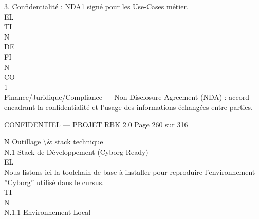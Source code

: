 \documentclass[12pt,landscape,a4paper]{article}
\newenvironment{confidential}
{\begin{tcolorbox}[
    colback=rbkred!5!white,
    colframe=rbkred!75!black,
    title=CONFIDENTIEL,
    fonttitle=\bfseries\color{white},
    coltitle=rbkred!75!black,
    breakable,
    enhanced,
    frame hidden,
    borderline west={2pt}{0pt}{rbkred!75!black}
]}
{\end{tcolorbox}}
\begin{document}
\vspace{0.5em}
3. Confidentialité : NDA1 signé pour les Use-Cases métier.\\
\vspace{0.5em}
\vspace{0.5em}
\vspace{0.5em}
\vspace{0.5em}
EL\\
TI\\
N\\
DE\\
FI\\
N\\
CO\\
\vspace{0.5em}
\vspace{0.5em}
\vspace{0.5em}
\vspace{0.5em}
1\\
Finance/Juridique/Compliance — Non-Disclosure Agreement (NDA) : accord encadrant la confidentialité et l’usage des informations échangées entre parties.\\
\vspace{0.5em}
\vspace{0.5em}
\begin{confidential}CONFIDENTIEL — PROJET RBK 2.0                                            Page 260 sur 316\end{confidential}
N \textbar{} Outillage \textbackslash{}& stack technique\\
\vspace{0.5em}
\vspace{0.5em}
N.1 Stack de Développement (Cyborg-Ready)\\
\vspace{0.5em}
\vspace{0.5em}
\vspace{0.5em}
\vspace{0.5em}
EL\\
Nous listons ici la toolchain de base à installer pour reproduire l’environnement ”Cyborg” utilisé dans le cursus.\\
\vspace{0.5em}
\vspace{0.5em}
\vspace{0.5em}
\vspace{0.5em}
TI\\
N\\
N.1.1 Environnement Local\\
\vspace{0.5em}
\end{document}
